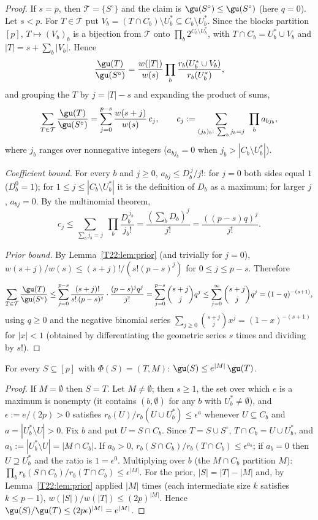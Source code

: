 \documentclass[11pt]{report}
\begin{document}
\begin{proof}
If $s=p$, then $\mathcal T=\{S^\circ\}$ and the claim is $\gu(S^\circ)\le\gu(S^\circ)$ (here $q=0$). Let $s<p$. For $T\in\mathcal T$ put $V_b=(T\cap C_b)\setminus U_b^*\subseteq C_b\setminus U_b^*$. Since the blocks partition $[p]$, $T\mapsto(V_b)_b$ is a bijection from $\mathcal T$ onto $\prod_b 2^{C_b\setminus U_b^*}$, with $T\cap C_b=U_b^*\cup V_b$ and $|T|=s+\sum_b|V_b|$. Hence
\[
\frac{\gu(T)}{\gu(S^\circ)}=\frac{w(|T|)}{w(s)}\prod_b\frac{r_b(U_b^*\cup V_b)}{r_b(U_b^*)} ,
\]
and grouping the $T$ by $j=|T|-s$ and expanding the product of sums,
\[
\sum_{T\in\mathcal T}\frac{\gu(T)}{\gu(S^\circ)}=\sum_{j=0}^{p-s}\frac{w(s+j)}{w(s)}\,c_j,\qquad c_j:=\sum_{(j_b)_b:\ \sum_b j_b=j}\ \prod_b a_{b j_b},
\]
where $j_b$ ranges over nonnegative integers ($a_{bj_b}=0$ when $j_b>|C_b\setminus U_b^*|$).

\emph{Coefficient bound.} For every $b$ and $j\ge0$, $a_{bj}\le D_b^{\,j}/j!$: for $j=0$ both sides equal $1$ ($D_b^0=1$); for $1\le j\le|C_b\setminus U_b^*|$ it is the definition of $D_b$ as a maximum; for larger $j$, $a_{bj}=0$. By the multinomial theorem,
\[
c_j\le\sum_{\sum_b j_b=j}\ \prod_b\frac{D_b^{\,j_b}}{j_b!}=\frac{(\sum_b D_b)^j}{j!}=\frac{((p-s)q)^j}{j!}.
\]

\emph{Prior bound.} By Lemma~\ref{T22:lem:prior} (and trivially for $j=0$), $w(s+j)/w(s)\le (s+j)!/(s!(p-s)^j)$ for $0\le j\le p-s$. Therefore
\[
\sum_{T\in\mathcal T}\frac{\gu(T)}{\gu(S^\circ)}\le\sum_{j=0}^{p-s}\frac{(s+j)!}{s!\,(p-s)^j}\cdot\frac{(p-s)^jq^j}{j!}=\sum_{j=0}^{p-s}\binom{s+j}{j}q^j\le\sum_{j=0}^{\infty}\binom{s+j}{j}q^j=(1-q)^{-(s+1)},
\]
using $q\ge0$ and the negative binomial series $\sum_{j\ge0}\binom{s+j}{j}x^j=(1-x)^{-(s+1)}$ for $|x|<1$ (obtained by differentiating the geometric series $s$ times and dividing by $s!$).
\end{proof}

\begin{T22lemma}\label{T22:lem:charge}
For every $S\subseteq[p]$ with $\Phi(S)=(T,M)$: $\gu(S)\le e^{|M|}\,\gu(T)$.
\end{T22lemma}

\begin{proof}
If $M=\emptyset$ then $S=T$. Let $M\neq\emptyset$; then $s\ge1$, the set over which $e$ is a maximum is nonempty (it contains $(b,\emptyset)$ for any $b$ with $U_b^*\neq\emptyset$), and $\epsilon:=e/(2p)>0$ satisfies $r_b(U)/r_b(U\cup U_b^*)\le\epsilon^{a}$ whenever $U\subseteq C_b$ and $a=|U_b^*\setminus U|>0$. Fix $b$ and put $U=S\cap C_b$. Since $T=S\cup S^\circ$, $T\cap C_b=U\cup U_b^*$, and $a_b:=|U_b^*\setminus U|=|M\cap C_b|$. If $a_b>0$, $r_b(S\cap C_b)/r_b(T\cap C_b)\le\epsilon^{a_b}$; if $a_b=0$ then $U\supseteq U_b^*$ and the ratio is $1=\epsilon^0$. Multiplying over $b$ (the $M\cap C_b$ partition $M$): $\prod_b r_b(S\cap C_b)/r_b(T\cap C_b)\le\epsilon^{|M|}$. For the prior, $|S|=|T|-|M|$ and, by Lemma~\ref{T22:lem:prior} applied $|M|$ times (each intermediate size $k$ satisfies $k\le p-1$), $w(|S|)/w(|T|)\le(2p)^{|M|}$. Hence $\gu(S)/\gu(T)\le(2p\epsilon)^{|M|}=e^{|M|}$.
\end{proof}
\end{document}

